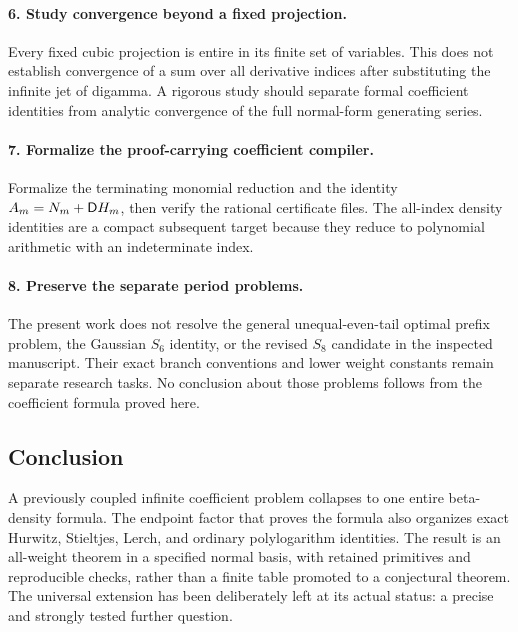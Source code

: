 \paragraph{6. Study convergence beyond a fixed projection.}
Every fixed cubic projection is entire in its finite set of variables.
This does not establish convergence of a sum over all derivative indices
after substituting the infinite jet of digamma. A rigorous study should
separate formal coefficient identities from analytic convergence of the
full normal-form generating series.

\paragraph{7. Formalize the proof-carrying coefficient compiler.}
Formalize the terminating monomial reduction and the identity
$A_m=N_m+\mathsf D H_m$, then verify the rational certificate files. The
all-index density identities are a compact subsequent target because they
reduce to polynomial arithmetic with an indeterminate index.

\paragraph{8. Preserve the separate period problems.}
The present work does not resolve the general unequal-even-tail optimal
prefix problem, the Gaussian $S_6$ identity, or the revised $S_8$ candidate
in the inspected manuscript. Their exact branch conventions and lower
weight constants remain separate research tasks. No conclusion about
those problems follows from the coefficient formula proved here.

\subsection*{Conclusion}
A previously coupled infinite coefficient problem collapses to one entire
beta-density formula. The endpoint factor that proves the formula also
organizes exact Hurwitz, Stieltjes, Lerch, and ordinary polylogarithm
identities. The result is an all-weight theorem in a specified normal
basis, with retained primitives and reproducible checks, rather than a
finite table promoted to a conjectural theorem. The universal extension
has been deliberately left at its actual status: a precise and strongly
tested further question.
